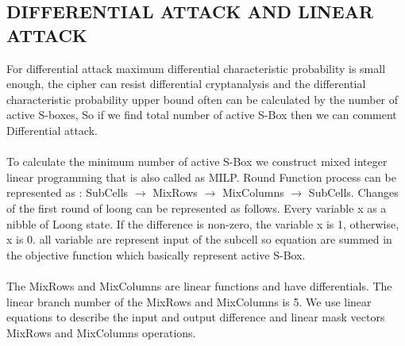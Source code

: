\documentclass[preprint]{transcrypto}
\begin{document}
\subsection{DIFFERENTIAL ATTACK AND LINEAR ATTACK}
For differential attack maximum differential characteristic probability is small enough,
the cipher can resist differential cryptanalysis and the differential characteristic probability
upper bound often can be calculated by the number of active S-boxes, So if we find total number of active S-Box then we can comment Differential attack.\\\\
To calculate the minimum number of active S-Box we construct mixed integer linear programming that is also called as MILP. Round Function process can be represented  as : SubCells $\rightarrow$ MixRows $\rightarrow$ MixColumns $\rightarrow$ SubCells. Changes of the first round  of loong can be represented as follows. Every variable x  as a nibble of Loong state. If the difference is non-zero, the variable x is 1, otherwise, x is 0. all variable are represent input of the subcell so equation are summed in the objective function which basically represent active S-Box. \\\\
The MixRows and MixColumns are linear functions and have
differentials. The linear branch number of the MixRows and
MixColumns is 5. We use linear equations to describe the
input and output difference and linear mask vectors MixRows
and MixColumns operations. \\\\
\end{document}
